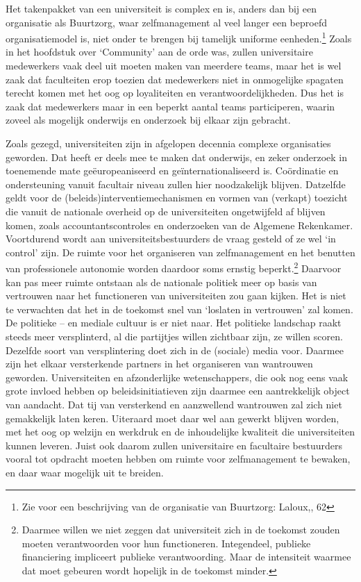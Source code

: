 \documentclass[empirical, authordate, ]{new-jote-article}
\begin{document}
	Het takenpakket van een universiteit is complex en is, anders dan bij een organisatie als Buurtzorg, waar zelfmanagement al veel langer een beproefd organisatiemodel is, niet onder te brengen bij tamelijk uniforme eenheden.\footnote{Zie voor een beschrijving van de organisatie van Buurtzorg: Laloux,, 62} Zoals in het hoofdstuk over ‘Community' aan de orde was, zullen universitaire medewerkers vaak deel uit moeten maken van meerdere teams, maar het is wel zaak dat faculteiten erop toezien dat medewerkers niet in onmogelijke spagaten terecht komen met het oog op loyaliteiten en verantwoordelijkheden. Dus het is zaak dat medewerkers maar in een beperkt aantal teams participeren, waarin zoveel als mogelijk onderwijs en onderzoek bij elkaar zijn gebracht.



	Zoals gezegd, universiteiten zijn in afgelopen decennia complexe organisaties geworden. Dat heeft er deels mee te maken dat onderwijs, en zeker onderzoek in toenemende mate geëuropeaniseerd en geïnternationaliseerd is. Coördinatie en ondersteuning vanuit facultair niveau zullen hier noodzakelijk blijven. Datzelfde geldt voor de (beleids)interventiemechanismen en vormen van (verkapt) toezicht die vanuit de nationale overheid op de universiteiten ongetwijfeld af blijven komen, zoals accountantscontroles en onderzoeken van de Algemene Rekenkamer. Voortdurend wordt aan universiteitsbestuurders de vraag gesteld of ze wel ‘in control' zijn. De ruimte voor het organiseren van zelfmanagement en het benutten van professionele autonomie worden daardoor soms ernstig beperkt.\footnote{Daarmee willen we niet zeggen dat universiteit zich in de toekomst zouden moeten verantwoorden voor hun functioneren. Integendeel, publieke financiering impliceert publieke verantwoording. Maar de intensiteit waarmee dat moet gebeuren wordt hopelijk in de toekomst minder.} Daarvoor kan pas meer ruimte ontstaan als de nationale politiek meer op basis van vertrouwen naar het functioneren van universiteiten zou gaan kijken. Het is niet te verwachten dat het in de toekomst snel van ‘loslaten in vertrouwen' zal komen. De politieke -- en mediale cultuur is er niet naar. Het politieke landschap raakt steeds meer versplinterd, al die partijtjes willen zichtbaar zijn, ze willen scoren. Dezelfde soort van versplintering doet zich in de (sociale) media voor. Daarmee zijn het elkaar versterkende partners in het organiseren van wantrouwen geworden. Universiteiten en afzonderlijke wetenschappers, die ook nog eens vaak grote invloed hebben op beleidsinitiatieven zijn daarmee een aantrekkelijk object van aandacht. Dat tij van versterkend en aanzwellend wantrouwen zal zich niet gemakkelijk laten keren. Uiteraard moet daar wel aan gewerkt blijven worden, met het oog op welzijn en werkdruk en de inhoudelijke kwaliteit die universiteiten kunnen leveren. Juist ook daarom zullen universitaire en facultaire bestuurders vooral tot opdracht moeten hebben om ruimte voor zelfmanagement te bewaken, en daar waar mogelijk uit te breiden.
\end{document}
